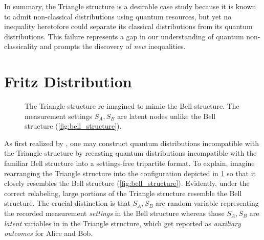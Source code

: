 \documentclass[aps, 10pt, english, twoside, pra, nofootinbib, tightenlines, longbibliography, superscriptaddress]{revtex4-1}
\begin{document}
    In summary, the Triangle structure is a desirable case study because it is known to admit non-classical distributions using quantum resources, but yet no inequality heretofore could separate its classical distributions from its quantum distributions. This failure represents a gap in our understanding of quantum non-classicality and prompts the discovery of \textit{new} inequalities.

    \section{Fritz Distribution}
    \label{sec:fritz_distribution}
    \begin{figure}
    \begin{nscenter}
        \caption{The Triangle structure re-imagined to mimic the Bell structure. The measurement settings $S_{A},S_{B}$ are latent nodes unlike the Bell structure (\cref{fig:bell_structure}).}
        \label{fig:triangle_structure_with_fritz_bell_embedded}
    \end{nscenter}
    \end{figure}

    As first realized by \citet{Fritz_2012}, one may construct quantum distributions incompatible with the Triangle structure by recasting quantum distributions incompatible with the familiar Bell structure into a settings-free tripartite format. To explain, imagine rearranging the Triangle structure into the configuration depicted in \cref{fig:triangle_structure_with_fritz_bell_embedded} so that it closely resembles the Bell structure (\cref{fig:bell_structure}). Evidently, under the correct relabeling, large portions of the Triangle structure resemble the Bell structure. The crucial distinction is that $S_{A}, S_{B}$ are random variable representing the recorded measurement \emph{settings} in the Bell structure whereas those $S_{A}, S_{B}$ are \emph{latent} variables in in the Triangle structure, which get reported as \textit{auxiliary outcomes} for Alice and Bob.
\end{document}
